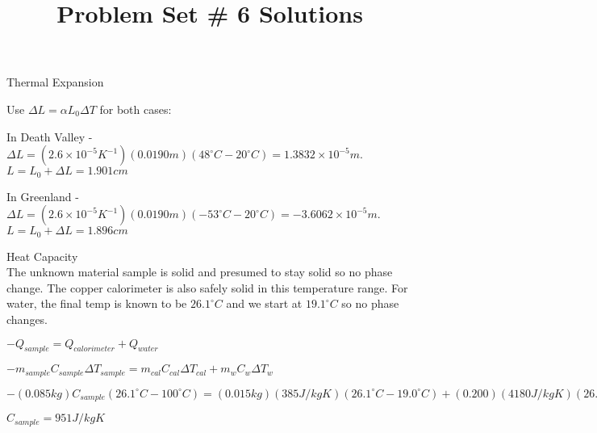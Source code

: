 \documentclass[10pt]{article}
\newenvironment{problem}[2][Problem]{\begin{trivlist}
\item[\hskip \labelsep {\bfseries #1}\hskip \labelsep {\bfseries #2.}]}{\end{trivlist}}
\begin{document}
 \title{Problem Set \# 6 Solutions}
\date{}
\author{}
\maketitle

\begin{problem}{1} Thermal Expansion\\
\item Use $\Delta L = \alpha L_0 \Delta T$ for both cases:
\item In Death Valley - $\Delta L = (2.6\times10^{-5}K^{-1}) (0.0190m) (48^\circ C - 20^\circ C)=1.3832\times10^{-5}m$. $L=L_0+\Delta L=1.901cm$
\item In Greenland - $\Delta L = (2.6\times10^{-5}K^{-1}) (0.0190m) (-53^\circ C - 20^\circ C)=-3.6062\times10^{-5}m$. $L=L_0+\Delta L= 1.896cm$

\end{problem}



\begin{problem}{2} Heat Capacity\\
The unknown material sample is solid and presumed to stay solid so no phase change. The copper calorimeter is also safely solid in this temperature range. For water, the final temp is known to be $26.1^\circ C$ and we start at $19.1^\circ C$ so no phase changes.
\item $-Q_{sample} = Q_{calorimeter} + Q_{water}$
\item $-m_{sample}C_{sample}\Delta T_{sample} = m_{cal}C_{cal}\Delta T_{cal} + m_w C_w \Delta T_{w}$
\item $-(0.085kg)C_{sample}(26.1^\circ C - 100^\circ C) = (0.015kg)(385J/kgK)(26.1^\circ C - 19.0^\circ C) + (0.200)(4180J/kgK)(26.1^\circ C - 19.0^\circ C)$
\item $C_{sample} = 951J/kgK$
\end{problem}
\end{document}
